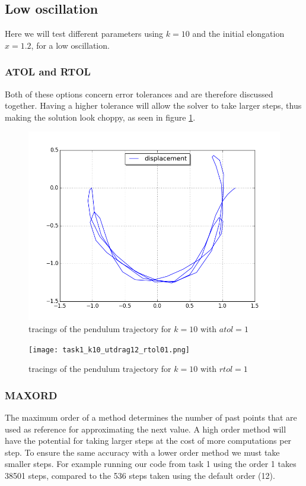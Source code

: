 \documentclass[a4paper,11pt]{article}
\theoremstyle{mytheor}
\begin{document}
\subsection*{Low oscillation}
Here we will test different parameters using $k = 10$ and the initial elongation $x = 1.2$, for a low oscillation.

\subsubsection*{ATOL and RTOL}


Both of these options concern error tolerances and are therefore discussed together. Having a higher tolerance will allow the solver to take larger steps, thus making the solution look choppy, as seen in figure \ref{3k10at01}.

\begin{figure}[!h]
\centering
\includegraphics[scale=0.5]{task1_k10_utdrag12_atol01.png}
\caption{tracings of the pendulum trajectory for $k = 10$ with $atol = 1$}
\label{3k10at01}
\end{figure}

\begin{figure}[!h]
\centering
\texttt{[image: task1\_k10\_utdrag12\_rtol01.png]}
\caption{tracings of the pendulum trajectory for $k = 10$ with $rtol = 1$}
\label{3k10rt01}
\end{figure}

\subsubsection*{MAXORD}
The maximum order of a method determines the number of past points that are used as reference for approximating the next value. A high order method will have the potential for taking larger steps at the cost of more computations per step. To ensure the same accuracy with a lower order method we must take smaller steps. For example running our code from task 1 using the order 1 takes 38501 steps, compared to the 536 steps taken using the default order (12).
\end{document}
